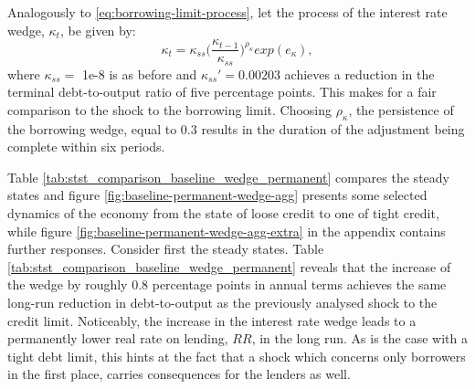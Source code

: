 \documentclass[12pt]{article} %
\numberwithin{equation}{section} %
\numberwithin{figure}{section}
\numberwithin{table}{section}
\begin{document}
Analogously to \eqref{eq:borrowing-limit-process}, let the process of the interest rate wedge, $\kappa_t$, be given by:
\begin{equation}
    \kappa_t = \kappa_{ss} \Bigg( \frac{\kappa_{t-1}}{\kappa_{ss}} \Bigg)^{\rho_{\kappa}} exp(e_{\kappa}), \label{eq:wedge-process}
\end{equation}
where $\kappa_{ss} =$ 1e-8 is as before and $\kappa_{ss}' = 0.00203$ achieves a reduction in the terminal debt-to-output ratio of five percentage points. This makes for a fair comparison to the shock to the borrowing limit. Choosing $\rho_{\kappa}$, the persistence of the borrowing wedge, equal to $0.3$ results in the duration of the adjustment being complete within six periods. 

Table \ref{tab:stst_comparison_baseline_wedge_permanent} compares the steady states and figure \ref{fig:baseline-permanent-wedge-agg} presents some selected dynamics of the economy from the state of loose credit to one of tight credit, while figure \ref{fig:baseline-permanent-wedge-agg-extra} in the appendix contains further responses. Consider first the steady states. Table \ref{tab:stst_comparison_baseline_wedge_permanent} reveals that the increase of the wedge by roughly $0.8$ percentage points in annual terms achieves the same long-run reduction in debt-to-output as the previously analysed shock to the credit limit. Noticeably, the increase in the interest rate wedge leads to a permanently lower real rate on lending, $RR$, in the long run. As is the case with a tight debt limit, this hints at the fact that a shock which concerns only borrowers in the first place, carries consequences for the lenders as well.
\end{document}
